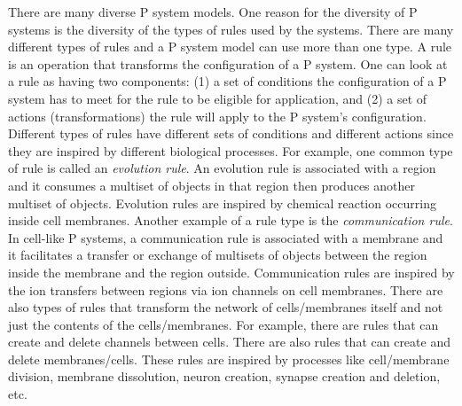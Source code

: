 \documentclass[a4paper]{article}
\theoremstyle{definition}
\begin{document}
There are many diverse P system models.  One reason for the diversity of P systems is the diversity 
of the types of rules used by the systems. There are many different types of rules and a P system 
model can use more than one type.  A rule is an operation that transforms the configuration of a P 
system. One can look at a rule as having two components: (1) a set of conditions the configuration 
of a P system has to meet for the rule to be eligible for application, and (2) a set of actions 
(transformations) the rule will apply to the P system's configuration. Different types of rules have
different sets of conditions and different actions since they are inspired by different biological 
processes. For example, one common type of rule is called an \emph{evolution rule}. An 
evolution rule is associated with a region and it consumes a multiset of objects in that region then 
produces another multiset of objects. Evolution rules are inspired by chemical reaction occurring
inside cell membranes. Another example of a rule type is the \emph{communication rule}. In cell-like 
P systems, a communication rule is associated with a membrane and it facilitates a transfer or 
exchange of multisets of objects between the region inside the membrane and the region outside. 
Communication rules are inspired by the ion transfers between regions via ion channels on cell 
membranes. There are also types of rules that transform the network of cells/membranes itself and 
not just the contents of the  cells/membranes. For example, there are rules that can create and 
delete channels between cells. There are also rules that can create and delete membranes/cells. 
These rules are inspired by processes like cell/membrane division, membrane dissolution, neuron 
creation, synapse creation and deletion, etc.
\end{document}
